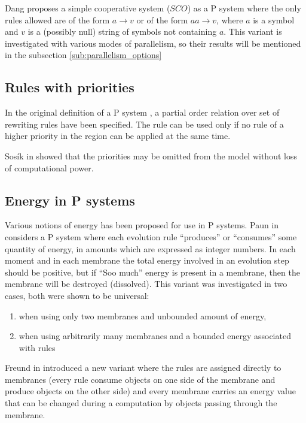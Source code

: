 Dang \cite{Ibarra04dang} proposes a simple cooperative system ($SCO$) as a P system where the only rules allowed are of the form $a\rightarrow v$ or of the form $aa\rightarrow v$, where $a$ is a symbol and $v$ is a (possibly null) string of symbols not containing $a$. This variant is investigated with various modes of parallelism, so their results will be mentioned in the subsection \ref{sub:parallelism_options}


\subsection{Rules with priorities} %
\label{sub:rules_with_priorities}

In the original definition of a P system \cite{Paun98}, a partial order relation over set of rewriting rules have been specified. The rule can be used only if no rule of a higher priority in the region can be applied at the same time.

Sos\'ik in \cite{Sosik:2002:WithoutPriorities} showed that the priorities may be omitted from the model without loss of computational power.


\subsection{Energy in P systems} %
\label{sub:energy_in_p_systems}

Various notions of energy has been proposed for use in P systems. Paun in \cite{Paun:2001:Energy} considers a P system where each evolution rule ``produces'' or ``consumes'' some quantity of energy, in amounts which are expressed as integer numbers. In each moment and in each membrane the total energy involved in an evolution step should be positive, but if ``Soo much'' energy is present in a membrane, then the membrane will be destroyed (dissolved). This variant was investigated in two cases, both were shown to be universal:

\begin{enumerate}
	\item when using only two membranes and unbounded amount of energy,
	\item when using arbitrarily many membranes and a bounded energy associated with rules
\end{enumerate}

Freund in \cite{Freund:2004:SequentialEnergy} introduced a new variant where the rules are assigned directly to membranes (every rule consume objects on one side of the membrane and produce objects on the other side) and every membrane carries an energy value that can be changed during a computation by objects passing through the membrane.


